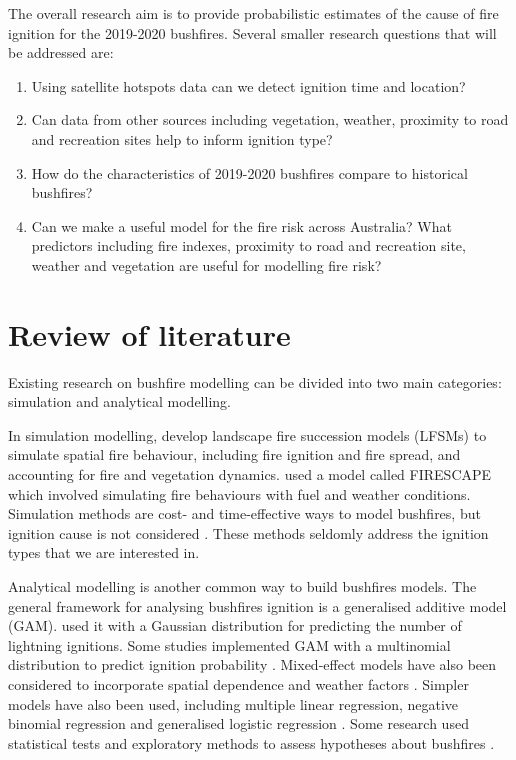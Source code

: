 \documentclass[11pt,a4paper,]{article}
\providecommand{\tightlist}{%
  \setlength{\itemsep}{0pt}\setlength{\parskip}{0pt}}
\begin{document}
The overall research aim is to provide probabilistic estimates of the cause of fire ignition for the 2019-2020 bushfires. Several smaller research questions that will be addressed are:

\begin{enumerate}
\def\labelenumi{\arabic{enumi}.}
\tightlist
\item
  Using satellite hotspots data can we detect ignition time and location?
\item
  Can data from other sources including vegetation, weather, proximity to road and recreation sites help to inform ignition type?
\item
  How do the characteristics of 2019-2020 bushfires compare to historical bushfires?
\item
  Can we make a useful model for the fire risk across Australia? What predictors including fire indexes, proximity to road and recreation site, weather and vegetation are useful for modelling fire risk?
\end{enumerate}

\hypertarget{review-of-literature}{%
\section{Review of literature}\label{review-of-literature}}

Existing research on bushfire modelling can be divided into two main categories: simulation and analytical modelling.

In simulation modelling, \textcite{keane2004classification} develop landscape fire succession models (LFSMs) to simulate spatial fire behaviour, including fire ignition and fire spread, and accounting for fire and vegetation dynamics. \textcite{bradstock2012wildfires} used a model called FIRESCAPE which involved simulating fire behaviours with fuel and weather conditions. Simulation methods are cost- and time-effective ways to model bushfires, but ignition cause is not considered \autocite{clarke2019developing}. These methods seldomly address the ignition types that we are interested in.

Analytical modelling is another common way to build bushfires models. The general framework for analysing bushfires ignition is a generalised additive model (GAM). \textcite{bates2018exploratory} used it with a Gaussian distribution for predicting the number of lightning ignitions. Some studies implemented GAM with a multinomial distribution to predict ignition probability \autocite{read2018lightning,zhang2017wildfire}. Mixed-effect models have also been considered to incorporate spatial dependence and weather factors \autocite{duff2018dryness}. Simpler models have also been used, including multiple linear regression, negative binomial regression and generalised logistic regression \autocite{cheney2012predicting,plucinski2014predicting,collins2015spatial}. Some research used statistical tests and exploratory methods to assess hypotheses about bushfires \autocite{miller2017electrically,dowdy2017pyrocumulonimbus}.
\end{document}
